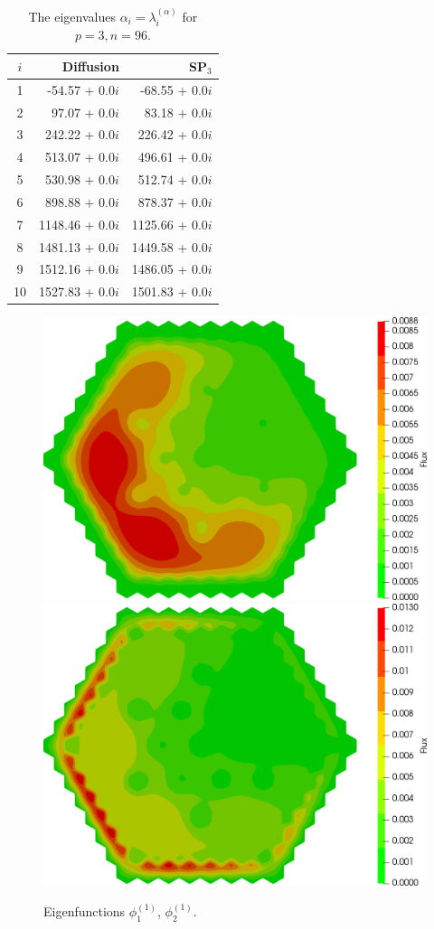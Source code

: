 \documentclass[authoryear]{elsarticle}
\begin{document}
\begin{table}[h]
\caption{The eigenvalues $\alpha_i=\lambda_i^{(\alpha)}$ for $p=3, n=96$.}
\label{tab:iaea_cosym_alpha_10}
\begin{center}
\begin{tabular}{crr}
\hline
$i$ & Diffusion & SP$_3$ \\
\hline
1 &-54.57 + 0.0$i$&-68.55 + 0.0$i$ \\
2 &  97.07 + 0.0$i$&83.18 + 0.0$i$ \\
3 &242.22 + 0.0$i$&226.42 + 0.0$i$ \\
4 &513.07 + 0.0$i$&496.61 + 0.0$i$ \\
5 &530.98 + 0.0$i$&512.74 + 0.0$i$ \\
6 &898.88 + 0.0$i$&878.37 + 0.0$i$ \\
7 &1148.46 + 0.0$i$&1125.66 + 0.0$i$ \\
8 &1481.13 + 0.0$i$&1449.58 + 0.0$i$ \\
9 &1512.16 + 0.0$i$&1486.05 + 0.0$i$ \\
10&1527.83 + 0.0$i$&1501.83 + 0.0$i$ \\
\hline
\end{tabular}
\end{center}
\end{table}

\begin{figure}[h]
\begin{center}
	\includegraphics[width=0.49\linewidth]{iaea_cosym/sp3_alpha_u1_1_assym.png}
	\includegraphics[width=0.49\linewidth]{iaea_cosym/sp3_alpha_u2_1_assym.png}\\
	\caption{Eigenfunctions $\phi_1^{(1)}$, $\phi_2^{(1)}$.}
	\label{fig:iaea_cosym_fun_1}
\end{center}
\end{figure}
\end{document}
